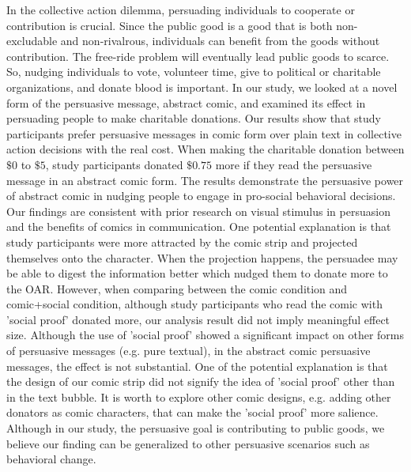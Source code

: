 In the collective action dilemma, persuading individuals to cooperate or contribution is crucial. Since the public good is a good that is both non-excludable and non-rivalrous, individuals can benefit from the goods without contribution. The free-ride problem will eventually lead public goods to scarce. So, nudging individuals to vote, volunteer time, give to political or charitable organizations, and donate blood is important. In our study, we looked at a novel form of the persuasive message, abstract comic, and examined its effect in persuading people to make charitable donations. Our results show that study participants prefer persuasive messages in comic form over plain text in collective action decisions with the real cost. When making the charitable donation between $\$0$ to $\$5$, study participants donated $\$ 0.75$ more if they read the persuasive message in an abstract comic form. The results demonstrate the persuasive power of abstract comic in nudging people to engage in pro-social behavioral decisions. Our findings are consistent with prior research on visual stimulus in persuasion and the benefits of comics in communication. One potential explanation is that study participants were more attracted by the comic strip and projected themselves onto the character. When the projection happens, the persuadee may be able to digest the information better which nudged them to donate more to the OAR. However, when comparing between the comic condition and comic+social condition, although study participants who read the comic with 'social proof' donated more, our analysis result did not imply meaningful effect size. Although the use of 'social proof' showed a significant impact on other forms of persuasive messages (e.g. pure textual), in the abstract comic persuasive messages, the effect is not substantial. One of the potential explanation is that the design of our comic strip did not signify the idea of 'social proof' other than in the text bubble. It is worth to explore other comic designs, e.g. adding other donators as comic characters, that can make the 'social proof' more salience. Although in our study, the persuasive goal is contributing to public goods, we believe our finding can be generalized to other persuasive scenarios such as behavioral change.

